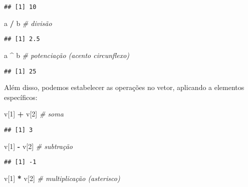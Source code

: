 \documentclass[
]{book}
\newenvironment{Shaded}{\begin{snugshade}}{\end{snugshade}}
\newcommand{\CommentTok}[1]{\textcolor[rgb]{0.56,0.35,0.01}{\textit{#1}}}
\newcommand{\DecValTok}[1]{\textcolor[rgb]{0.00,0.00,0.81}{#1}}
\newcommand{\NormalTok}[1]{#1}
\newcommand{\OperatorTok}[1]{\textcolor[rgb]{0.81,0.36,0.00}{\textbf{#1}}}
\newcommand{\StringTok}[1]{\textcolor[rgb]{0.31,0.60,0.02}{#1}}
\begin{document}
\begin{verbatim}
## [1] 10
\end{verbatim}

\begin{Shaded}
\begin{Highlighting}[]
\NormalTok{a }\OperatorTok{/}\StringTok{ }\NormalTok{b }\CommentTok{# divisão}
\end{Highlighting}
\end{Shaded}

\begin{verbatim}
## [1] 2.5
\end{verbatim}

\begin{Shaded}
\begin{Highlighting}[]
\NormalTok{a }\OperatorTok{^}\StringTok{ }\NormalTok{b }\CommentTok{# potenciação (acento circunflexo)}
\end{Highlighting}
\end{Shaded}

\begin{verbatim}
## [1] 25
\end{verbatim}

Além disso, podemos estabelecer as operações no vetor, aplicando a elementos específicos:

\begin{Shaded}
\begin{Highlighting}[]
\NormalTok{v[}\DecValTok{1}\NormalTok{] }\OperatorTok{+}\StringTok{ }\NormalTok{v[}\DecValTok{2}\NormalTok{] }\CommentTok{# soma}
\end{Highlighting}
\end{Shaded}

\begin{verbatim}
## [1] 3
\end{verbatim}

\begin{Shaded}
\begin{Highlighting}[]
\NormalTok{v[}\DecValTok{1}\NormalTok{] }\OperatorTok{-}\StringTok{ }\NormalTok{v[}\DecValTok{2}\NormalTok{] }\CommentTok{# subtração}
\end{Highlighting}
\end{Shaded}

\begin{verbatim}
## [1] -1
\end{verbatim}

\begin{Shaded}
\begin{Highlighting}[]
\NormalTok{v[}\DecValTok{1}\NormalTok{] }\OperatorTok{*}\StringTok{ }\NormalTok{v[}\DecValTok{2}\NormalTok{] }\CommentTok{# multiplicação (asterisco)}
\end{Highlighting}
\end{Shaded}
\end{document}
